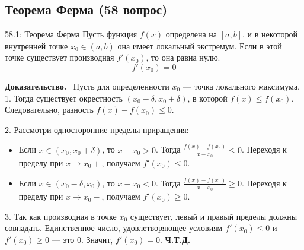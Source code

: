 \documentclass[a4paper,12pt]{article}
\newcommand{\myproof}{\textbf{Доказательство.}\ }
\begin{document}
	
	
	
	
	
	\newpage
	\subsection{Теорема Ферма (58 вопрос)}
	
	\begin{theorembox}{58.1: Теорема Ферма}
		Пусть функция $f(x)$ определена на $[a, b]$, и в некоторой внутренней точке $x_0 \in (a, b)$ она имеет локальный экстремум. Если в этой точке существует производная $f'(x_0)$, то она равна нулю.
		$$ f'(x_0) = 0 $$
	\end{theorembox}
	
	\myproof
	Пусть для определенности $x_0$ --- точка локального максимума. 
	1. Тогда существует окрестность $(x_0 - \delta, x_0 + \delta)$, в которой $f(x) \leq f(x_0)$. Следовательно, разность $f(x) - f(x_0) \leq 0$.
	
	2. Рассмотри односторонние пределы приращения:
	\begin{itemize}
		\item Если $x \in (x_0, x_0 + \delta)$, то $x - x_0 > 0$. Тогда $\frac{f(x) - f(x_0)}{x - x_0} \leq 0$. Переходя к пределу при $x \to x_0+$, получаем $f'(x_0) \leq 0$.
		\item Если $x \in (x_0 - \delta, x_0)$, то $x - x_0 < 0$. Тогда $\frac{f(x) - f(x_0)}{x - x_0} \geq 0$. Переходя к пределу при $x \to x_0-$, получаем $f'(x_0) \geq 0$.
	\end{itemize}
	
	3. Так как производная в точке $x_0$ существует, левый и правый пределы должны совпадать. Единственное число, удовлетворяющее условиям $f'(x_0) \leq 0$ и $f'(x_0) \geq 0$ --- это $0$. Значит, $f'(x_0) = 0$. \textbf{Ч.Т.Д.}
	
	
	
	
	\begin{center}
	\end{center}
	
\end{document}
